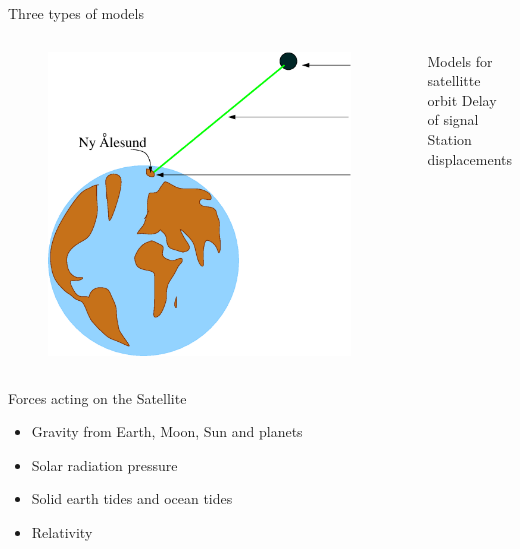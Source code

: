 \documentclass[12pt]{beamer}
\begin{document}
\begin{frame}{Three types of models}
  \begin{columns}
      \begin{figure}
        \includegraphics[width=0.95\textwidth]{figure/korreksjoner.eps}
      \end{figure}
        Models for satellitte orbit\vspace{0.4cm}
        Delay of signal\vspace{0.4cm} \\
        Station displacements\vspace{2.5cm}
  \end{columns}
\end{frame}


\begin{frame}{Forces acting on the Satellite}
\begin{itemize}
\item
  Gravity from Earth, Moon, Sun and planets
\item 
  Solar radiation pressure
\item 
  Solid earth tides and ocean tides
\item 
  Relativity
\end{itemize}
\end{frame}
\end{document}
